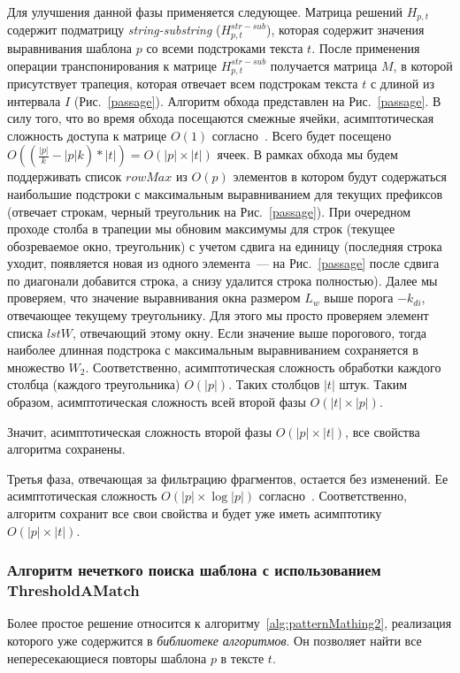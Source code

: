 Для улучшения данной фазы применяется следующее.
Матрица решений $H_{p,t}$ содержит подматрицу \emph{string-substring} ($H^{str-sub}_{p,t}$), которая содержит значения выравнивания шаблона $p$ со всеми подстроками текста $t$.
После применения операции транспонирования к матрице $H^{str-sub}_{p,t}$ получается матрица $M$, в которой присутствует трапеция, которая отвечает всем подстрокам текста $t$ с длиной из интервала $I$ (Рис.~\ref{passage}).
Алгоритм обхода представлен на Рис.~\ref{passage}.
В силу того, что во время обхода посещаются смежные ячейки, асимптотическая сложность доступа к матрице $O(1)$ согласно~\cite{tiskin2008semi}.
Всего будет посещено $O((\frac{|p|}{k}-|p|k)*|t|)=O(|p|\times|t|)$ ячеек.
В рамках обхода мы будем поддерживать список $rowMax$ из $O(p)$ элементов в котором будут содержаться наибольшие подстроки с максимальным выравниванием для текущих префиксов (отвечает строкам, черный треугольник на Рис.~\ref{passage}).
При очередном  проходе столба в трапеции мы обновим максимумы для строк (текущее обозреваемое окно, треугольник) с учетом сдвига на единицу (последняя строка уходит, появляется новая из одного элемента~--- на Рис.~\ref{passage} после сдвига по диагонали добавится строка, а снизу удалится строка полностью).
Далее мы проверяем, что значение выравнивания окна размером $L_{w}$ выше порога $-k_{di}$, отвечающее текущему треугольнику. Для этого мы просто проверяем элемент списка $lstW$, отвечающий этому окну.
Если значение выше порогового, тогда наиболее длинная подстрока с максимальным выравниванием сохраняется в множество $W_{2}$.
Соответственно, асимптотическая сложность обработки каждого столбца (каждого треугольника)  $O(|p|)$.
Таких столбцов $|t|$ штук.
Таким образом, асимптотическая сложность всей второй фазы $O(|t| \times |p|)$.

Значит, асимптотическая сложность второй фазы $O(|p| \times |t|)$, все свойства алгоритма сохранены.

Третья фаза, отвечающая за фильтрацию фрагментов, остается без изменений. Ее асимптотическая сложность $O(|p| \times \log |p|)$ согласно~\cite{luciv2019interactive}.
Соответственно, алгоритм сохранит все свои свойства и будет уже иметь асимптотику $O(|p| \times |t|)$.

\subsubsection{Алгоритм нечеткого поиска шаблона с использованием ThresholdAMatch}
Более простое решение относится к алгоритму~\ref{alg:patternMathing2}, реализация которого уже содержится в \emph{библиотеке алгоритмов}. 
Он позволяет найти все непересекающиеся повторы шаблона $p$ в тексте $t$.

